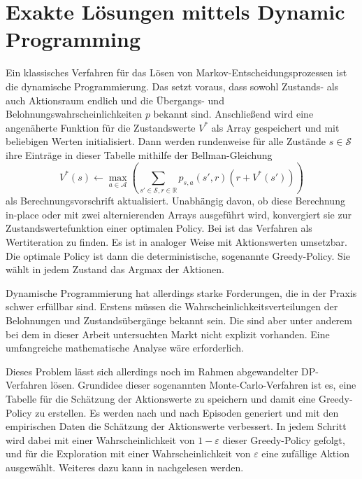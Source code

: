 \section{Exakte Lösungen mittels Dynamic Programming}
\label{section:dp}
Ein klassisches Verfahren für das Lösen von Markov-Entscheidungsprozessen ist die dynamische Programmierung.
Das setzt voraus, dass sowohl Zustands- als auch Aktionsraum endlich und die Übergangs- und Belohnungswahrscheinlichkeiten $p$ bekannt sind.
Anschließend wird eine angenäherte Funktion für die Zustandswerte $V^*$ als Array gespeichert und mit beliebigen Werten initialisiert.
Dann werden rundenweise für alle Zustände $s\in\mathcal{S}$ ihre Einträge in dieser Tabelle mithilfe der Bellman-Gleichung
\begin{equation}
	V^*(s) \leftarrow \max_{a\in\mathcal{A}}{\left(\sum_{s'\in\mathcal{S}, r \in \mathbb{R}}{p_{s, a}\left(s', r\right) \left(r + V^*(s')\right)}\right)}
\end{equation}
als Berechnungsvorschrift aktualisiert.
Unabhängig davon, ob diese Berechnung in-place oder mit zwei alternierenden Arrays ausgeführt wird, konvergiert sie zur Zustandswertefunktion einer optimalen Policy.
Bei \cite{Sutton1998} ist das Verfahren als Wertiteration zu finden.
Es ist in analoger Weise mit Aktionswerten umsetzbar.
Die optimale Policy ist dann die deterministische, sogenannte Greedy-Policy.
Sie wählt in jedem Zustand das Argmax der Aktionen.

Dynamische Programmierung hat allerdings starke Forderungen, die in der Praxis schwer erfüllbar sind.
Erstens müssen die Wahrscheinlichkeitsverteilungen der Belohnungen und Zustandsübergänge bekannt sein.
Die sind aber unter anderem bei dem in dieser Arbeit untersuchten Markt nicht explizit vorhanden.
Eine umfangreiche mathematische Analyse wäre erforderlich.

Dieses Problem lässt sich allerdings noch im Rahmen abgewandelter DP-Verfahren lösen.
Grundidee dieser sogenannten Monte-Carlo-Verfahren ist es, eine Tabelle für die Schätzung der Aktionswerte zu speichern und damit eine Greedy-Policy zu erstellen.
Es werden nach und nach Episoden generiert und mit den empirischen Daten die Schätzung der Aktionswerte verbessert.
In jedem Schritt wird dabei mit einer Wahrscheinlichkeit von $1-\varepsilon$ dieser Greedy-Policy gefolgt, und für die Exploration mit einer Wahrscheinlichkeit von $\varepsilon$ eine zufällige Aktion ausgewählt.
Weiteres dazu kann in \cite{Sutton1998} nachgelesen werden.


